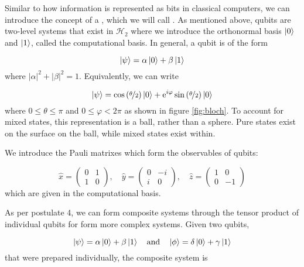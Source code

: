 Similar to how information is represented as bits in classical computers, we can introduce the concept of a , which we will call . As mentioned above, qubits are two-level systems that exist in $\mathcal{H}_2$ where we introduce the orthonormal basis $\ket{0}$ and $\ket{1}$, called the computational basis. In general, a qubit is of the form 

\begin{equation}
	\ket{\psi} = \alpha\ket{0} + \beta\ket{1}
\end{equation}
where $|\alpha|^2 + |\beta|^2 = 1$. Equivalently, we can write

\begin{equation}
	\ket{\psi} = \cos\left(\nicefrac{\theta}{2}\right)\ket{0} + \mathrm{e}^{i\varphi}\sin\left(\nicefrac{\theta}{2}\right)\ket{0}
\end{equation}
where $0\le\theta\le\pi$ and $0\le\varphi<2\pi$ as shown in figure \ref{fig:bloch}. To account for mixed states, this representation is a ball, rather than a sphere. Pure states exist on the surface on the ball, while mixed states exist within.

We introduce the Pauli matrixes which form the observables of qubits: 

\begin{equation}
	\hat{x} = \left(\begin{matrix}
		0 & 1 \\
		1 & 0
	\end{matrix}\right),
	\quad
	\hat{y} = \left(\begin{matrix}
		0 & -i \\
		i & 0
	\end{matrix}\right),
	\quad
	\hat{z} = \left(\begin{matrix}
		1 & 0 \\
		0 & -1
	\end{matrix}\right)
\end{equation}
which are given in the computational basis. 

As per postulate 4, we can form composite systems through the tensor product of individual qubits for form more complex systems. Given two qubits,

\begin{equation}
	\ket{\psi} = \alpha\ket{0} + \beta\ket{1} \quad \text{and} \quad \ket{\phi} = \delta\ket{0} + \gamma\ket{1}
\end{equation} 
that were prepared individually, the composite system is

